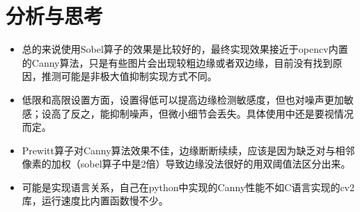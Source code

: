 \documentclass[12pt,a4paper]{article}
\begin{document}
\section{分析与思考}
\begin{itemize}
\item 总的来说使用Sobel算子的效果是比较好的，最终实现效果接近于opencv内置的Canny算法，只是有些图片会出现较粗边缘或者双边缘，目前没有找到原因，推测可能是非极大值抑制实现方式不同。 
\item 低限和高限设置方面，设置得低可以提高边缘检测敏感度，但也对噪声更加敏感；设高了反之，能抑制噪声，但微小细节会丢失。具体使用中还是要视情况而定。
\item Prewitt算子对Canny算法效果不佳，边缘断断续续，应该是因为缺乏对与相邻像素的加权（sobel算子中是2倍）导致边缘没法很好的用双阈值法区分出来。
\item 可能是实现语言关系，自己在python中实现的Canny性能不如C语言实现的cv2库，运行速度比内置函数慢不少。
\end{itemize}

\newpage
\end{document}
